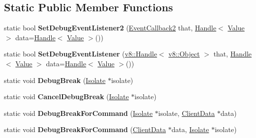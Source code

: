\subsection*{Static Public Member Functions}
\begin{DoxyCompactItemize}
\item 
\hypertarget{classv8_1_1Debug_aff46ffb7c2a8e9c6549a7ef74452fce5}{static bool {\bfseries Set\-Debug\-Event\-Listener2} (\hyperlink{classv8_1_1Debug_a7c7d64ad935a571c7ee374d8230a1ef7}{Event\-Callback2} that, \hyperlink{classv8_1_1Handle}{Handle}$<$ \hyperlink{classv8_1_1Value}{Value} $>$ data=\hyperlink{classv8_1_1Handle}{Handle}$<$ \hyperlink{classv8_1_1Value}{Value} $>$())}\label{classv8_1_1Debug_aff46ffb7c2a8e9c6549a7ef74452fce5}

\item 
\hypertarget{classv8_1_1Debug_a9195f4cb819848a07dc71a5bae43274d}{static bool {\bfseries Set\-Debug\-Event\-Listener} (\hyperlink{classv8_1_1Handle}{v8\-::\-Handle}$<$ \hyperlink{classv8_1_1Object}{v8\-::\-Object} $>$ that, \hyperlink{classv8_1_1Handle}{Handle}$<$ \hyperlink{classv8_1_1Value}{Value} $>$ data=\hyperlink{classv8_1_1Handle}{Handle}$<$ \hyperlink{classv8_1_1Value}{Value} $>$())}\label{classv8_1_1Debug_a9195f4cb819848a07dc71a5bae43274d}

\item 
\hypertarget{classv8_1_1Debug_a0c730ea558b1fc86cb728980c91a4c7c}{static void {\bfseries Debug\-Break} (\hyperlink{classv8_1_1Isolate}{Isolate} $\ast$isolate)}\label{classv8_1_1Debug_a0c730ea558b1fc86cb728980c91a4c7c}

\item 
\hypertarget{classv8_1_1Debug_a976a373dc06c146cdbe8d6f2fd7f57b5}{static void {\bfseries Cancel\-Debug\-Break} (\hyperlink{classv8_1_1Isolate}{Isolate} $\ast$isolate)}\label{classv8_1_1Debug_a976a373dc06c146cdbe8d6f2fd7f57b5}

\item 
\hypertarget{classv8_1_1Debug_a44528a1005a8256037a0f45c93afd0db}{static void {\bfseries Debug\-Break\-For\-Command} (\hyperlink{classv8_1_1Isolate}{Isolate} $\ast$isolate, \hyperlink{classv8_1_1Debug_1_1ClientData}{Client\-Data} $\ast$data)}\label{classv8_1_1Debug_a44528a1005a8256037a0f45c93afd0db}

\item 
\hypertarget{classv8_1_1Debug_a9e470f5ca7faa631823c4a43b644237b}{static void {\bfseries Debug\-Break\-For\-Command} (\hyperlink{classv8_1_1Debug_1_1ClientData}{Client\-Data} $\ast$data, \hyperlink{classv8_1_1Isolate}{Isolate} $\ast$isolate)}\label{classv8_1_1Debug_a9e470f5ca7faa631823c4a43b644237b}


\end{DoxyCompactItemize}
